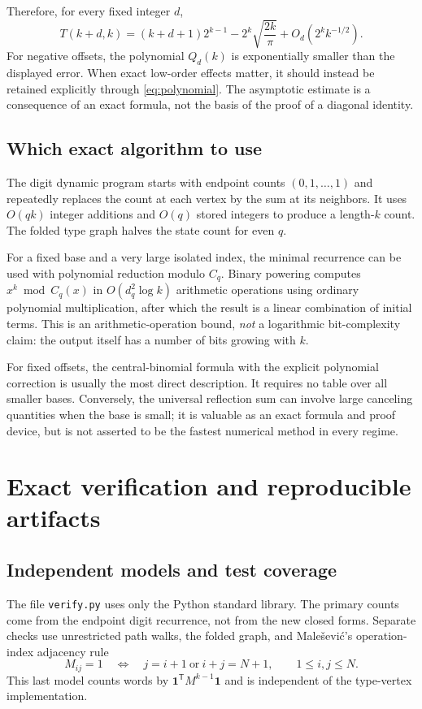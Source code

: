 \documentclass[11pt,letterpaper]{article}
\numberwithin{equation}{section}
\theoremstyle{definition}
\newcommand{\one}{\mathbf 1}
\begin{document}
Therefore, for every fixed integer $d$,
\begin{equation}\label{eq:diagasy}
T(k+d,k)=(k+d+1)2^{k-1}
-2^k\sqrt{\frac{2k}{\pi}}+O_d(2^kk^{-1/2}).
\end{equation}
For negative offsets, the polynomial $Q_d(k)$ is exponentially smaller
than the displayed error.  When exact low-order effects matter, it
should instead be retained explicitly through \eqref{eq:polynomial}.
The asymptotic estimate is a consequence of an exact formula, not the
basis of the proof of a diagonal identity.

\subsection{Which exact algorithm to use}
The digit dynamic program starts with endpoint counts
$(0,1,\ldots,1)$ and repeatedly replaces the count at each vertex by the
sum at its neighbors.  It uses $O(qk)$ integer additions and $O(q)$
stored integers to produce a length-$k$ count.  The folded type graph
halves the state count for even $q$.

For a fixed base and a very large isolated index, the minimal recurrence
can be used with polynomial reduction modulo $C_q$.  Binary powering
computes $x^k\bmod C_q(x)$ in $O(d_q^2\log k)$ arithmetic operations
using ordinary polynomial multiplication, after which the result is a
linear combination of initial terms.  This is an arithmetic-operation
bound, \emph{not} a logarithmic bit-complexity claim: the output itself
has a number of bits growing with $k$.

For fixed offsets, the central-binomial formula with the explicit
polynomial correction is usually the most direct description.  It
requires no table over all smaller bases.  Conversely, the universal
reflection sum can involve large canceling quantities when the base
is small; it is valuable as an exact formula and proof device, but is
not asserted to be the fastest numerical method in every regime.

\section{Exact verification and reproducible artifacts}
\label{sec:verification}

\subsection{Independent models and test coverage}
The file \texttt{verify.py} uses only the Python standard library.
The primary counts come from the endpoint digit recurrence, not from
the new closed forms.  Separate checks use unrestricted path walks,
the folded graph, and Male\v sevi\'c's operation-index adjacency rule
\[
M_{ij}=1\quad\Longleftrightarrow\quad
j=i+1\ \text{or}\ i+j=N+1,
\qquad 1\le i,j\le N.
\]
This last model counts words by $\one^{\mathsf T}M^{k-1}\one$ and is
independent of the type-vertex implementation.
\end{document}
